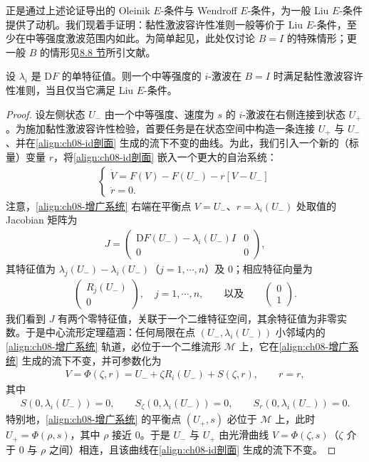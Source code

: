 \documentclass[../../main.tex]{subfiles}
\begin{document}
正是通过上述论证导出的 Oleinik $E$-条件与 Wendroff $E$-条件，为一般 Liu $E$-条件提供了动机。我们现着手证明：黏性激波容许性准则一般等价于 Liu $E$-条件，至少在中等强度激波范围内如此。为简单起见，此处仅讨论 $B=I$ 的特殊情形；更一般 $B$ 的情形见\hyperref[section:ch08-注记]{8.8 节}所引文献。

\begin{theorem}\label{theorem:ch08-黏性等价liu}
设 $\lambda_i$ 是 $\mathrm{D}F$ 的单特征值。则一个中等强度的 $i$-激波在 $B=I$ 时满足黏性激波容许性准则，当且仅当它满足 Liu $E$-条件。
\end{theorem}

\begin{proof}
设左侧状态 $U_-$ 由一个中等强度、速度为 $s$ 的 $i$-激波在右侧连接到状态 $U_+$。为施加黏性激波容许性检验，首要任务是在状态空间中构造一条连接 $U_+$ 与 $U_-$、并在\eqref{align:ch08-id剖面} 生成的流下不变的曲线。为此，我们引入一个新的（标量）变量 $r$，将\eqref{align:ch08-id剖面} 嵌入一个更大的自治系统：
\begin{align}
\begin{cases}
\dot V=F(V)-F(U_-)-r[V-U_-]\\
\dot r=0.
\end{cases}
\label{align:ch08-增广系统}
\end{align}
注意，\eqref{align:ch08-增广系统} 右端在平衡点 $V=U_-$、$r=\lambda_i(U_-)$ 处取值的 Jacobian 矩阵为
\begin{align}
J=\left(\begin{array}{c|c}
\mathrm{D}F(U_-)-\lambda_i(U_-)I&0\\ \hline 0&0
\end{array}\right),
\label{align:ch08-jacobian}
\end{align}
其特征值为 $\lambda_j(U_-)-\lambda_i(U_-)$（$j=1,\cdots,n$）及 $0$；相应特征向量为
\begin{align}
\begin{pmatrix}R_j(U_-)\\0\end{pmatrix},\quad j=1,\cdots,n,\qquad\text{以及}\qquad\begin{pmatrix}0\\1\end{pmatrix}.
\label{align:ch08-特征向量}
\end{align}
我们看到 $J$ 有两个零特征值，关联于一个二维特征空间，其余特征值为非零实数。于是中心流形定理蕴涵：任何局限在点 $(U_-,\lambda_i(U_-))$ 小邻域内的\eqref{align:ch08-增广系统} 轨道，必位于一个二维流形 $\mathscr M$ 上，它在\eqref{align:ch08-增广系统} 生成的流下不变，并可参数化为
\begin{align}
V=\Phi(\zeta,r)=U_-+\zeta R_i(U_-)+S(\zeta,r),\qquad r=r,
\label{align:ch08-中心流形}
\end{align}
其中
\begin{align}
S(0,\lambda_i(U_-))=0,\qquad S_\zeta(0,\lambda_i(U_-))=0,\qquad S_r(0,\lambda_i(U_-))=0.
\label{align:ch08-中心条件}
\end{align}
特别地，\eqref{align:ch08-增广系统} 的平衡点 $(U_+,s)$ 必位于 $\mathscr M$ 上，此时 $U_+=\Phi(\rho,s)$，其中 $\rho$ 接近 $0$。于是 $U_-$ 与 $U_+$ 由光滑曲线 $V=\Phi(\zeta,s)$（$\zeta$ 介于 $0$ 与 $\rho$ 之间）相连，且该曲线在\eqref{align:ch08-id剖面} 生成的流下不变。


\end{proof}
\end{document}
